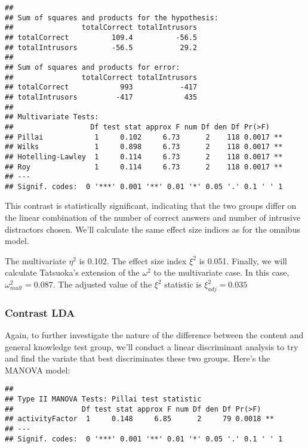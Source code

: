 \documentclass[11pt,]{article}
\begin{document}
\begin{verbatim}
## 
## Sum of squares and products for the hypothesis:
##                totalCorrect totalIntrusors
## totalCorrect          109.4          -56.5
## totalIntrusors        -56.5           29.2
## 
## Sum of squares and products for error:
##                totalCorrect totalIntrusors
## totalCorrect            993           -417
## totalIntrusors         -417            435
## 
## Multivariate Tests: 
##                  Df test stat approx F num Df den Df Pr(>F)   
## Pillai            1     0.102     6.73      2    118 0.0017 **
## Wilks             1     0.898     6.73      2    118 0.0017 **
## Hotelling-Lawley  1     0.114     6.73      2    118 0.0017 **
## Roy               1     0.114     6.73      2    118 0.0017 **
## ---
## Signif. codes:  0 '***' 0.001 '**' 0.01 '*' 0.05 '.' 0.1 ' ' 1
\end{verbatim}

This contrast is statistically significant, indicating that the two
groups differ on the linear combination of the number of correct answers
and number of intrusive distractors chosen. We'll calculate the same
effect size indices as for the omnibus model.

The multivariate \(\eta^2\) is 0.102. The effect size index \(\xi^2\) is
0.051. Finally, we will calculate Tatsuoka's
\citep[1970; according to][]{hubertyAppliedMANOVADiscriminant2006}
extension of the \(\omega^2\) to the multivariate case. In this case,
\(\omega^2_{mult} = 0.087\). The adjusted value of the \(\xi^2\)
statistic is \(\xi^2_{adj} = 0.035\)

\hypertarget{contrast-lda}{%
\subsubsection{Contrast LDA}\label{contrast-lda}}

Again, to further investigate the nature of the difference between the
content and general knowledge test group, we'll conduct a linear
discriminant analysis to try and find the variate that best
discriminates these two groups. Here's the MANOVA model:

\begin{verbatim}
## 
## Type II MANOVA Tests: Pillai test statistic
##                Df test stat approx F num Df den Df Pr(>F)   
## activityFactor  1     0.148     6.85      2     79 0.0018 **
## ---
## Signif. codes:  0 '***' 0.001 '**' 0.01 '*' 0.05 '.' 0.1 ' ' 1
\end{verbatim}
\end{document}
